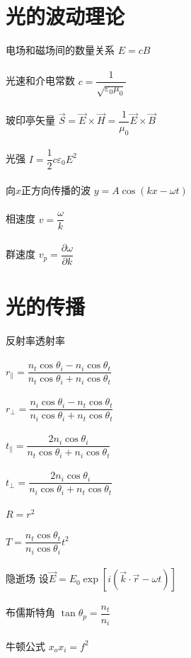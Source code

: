 \documentclass{article}
\begin{document}
\begin{multicols}{2}

\section{光的波动理论}

电场和磁场间的数量关系 $E = c B$
\\\\
光速和介电常数 $c = \dfrac{1}{\sqrt{\varepsilon_0 \mu_0}} $
\\\\
玻印亭矢量 $\vec{S} = \vec{E} \times \vec{H} = \dfrac{1}{\mu_0} \vec{E} \times \vec{B} $
\\\\
光强 $I = \dfrac{1}{2} c \varepsilon_0 E^2 $
\\\\
向$x$正方向传播的波 $y = A \cos \left( k x - \omega t \right)$
\\\\
相速度 $v = \dfrac{\omega}{k} $
\\\\
群速度 $v_p = \dfrac{\partial \omega}{\partial k} $

\section{光的传播}

反射率透射率
\\\\
$r_{\parallel} = \dfrac{n_t \cos \theta_i - n_i \cos \theta_t}{n_t \cos \theta_i + n_i \cos \theta_t} $
\\\\
$r_{\perp} = \dfrac{n_i \cos \theta_i - n_t \cos \theta_t}{n_i \cos \theta_i + n_t \cos \theta_t} $
\\\\
$t_{\parallel} = \dfrac{2 n_i \cos \theta_i}{n_t \cos \theta_i + n_i \cos \theta_t} $
\\\\
$t_{\perp} = \dfrac{2 n_i \cos \theta_i }{n_i \cos \theta_i + n_t \cos \theta_t} $
\\\\
$R = r^2$
\\\\
$T = \dfrac{n_t \cos \theta_t}{n_i \cos \theta_i} t^2 $
\\\\
隐逝场 设$\vec{E} = E_0 \exp \left[ i \left( \vec{k} \cdot \vec{r} - \omega t \right) \right]$
\\\\
布儒斯特角 $\tan \theta_p = \dfrac{n_t}{n_i} $
\\\\
牛顿公式 $x_o x_i = f^2$


\end{multicols}
\end{document}
